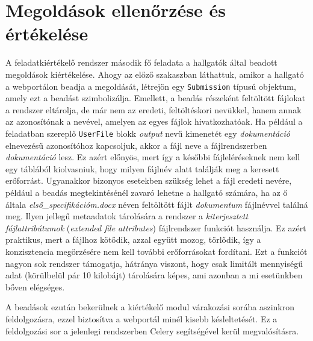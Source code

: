 \section{Megoldások ellenőrzése és értékelése}\label{section:submission-evaluation}
A feladatkiértékelő rendszer második fő feladata a hallgatók által beadott megoldások kiértékelése.
Ahogy az előző szakaszban láthattuk, amikor a hallgató a webportálon beadja a megoldását, létrejön egy \texttt{Submission} típusú objektum, amely ezt a beadást szimbolizálja.
Emellett, a beadás részeként feltöltött fájlokat a rendszer eltárolja, de már nem az eredeti, feltöltéskori nevükkel, hanem annak az azonosítónak a nevével, amelyen az egyes fájlok hivatkozhatóak.
Ha például a feladatban szereplő \texttt{UserFile} blokk \textit{output} nevű kimenetét egy \textit{dokumentáció} elnevezésű azonosítóhoz kapcsoljuk, akkor a fájl neve a fájlrendszerben \textit{dokumentáció} lesz.
Ez azért előnyös, mert így a későbbi fájleléréseknek nem kell egy táblából kiolvasniuk, hogy milyen fájlnév alatt találják meg a keresett erőforrást.
Ugyanakkor bizonyos esetekben szükség lehet a fájl eredeti nevére, például a beadás megtekintésénél zavaró lehetne a hallgató számára, ha az ő általa \textit{első\_specifikációm.docx} néven feltöltött fájlt \textit{dokumentum} fájlnévvel találná meg.
Ilyen jellegű metaadatok tárolására a rendszer a \textit{kiterjesztett fájlattribútumok} (\textit{extended file attributes}) fájlrendszer funkciót használja.
Ez azért praktikus, mert a fájlhoz kötődik, azzal együtt mozog, törlődik, így a konzisztencia megörzésére nem kell további erőforrásokat fordítani.
Ezt a funkciót nagyon sok rendszer támogatja, hátránya viszont, hogy csak limitált mennyiségű adat (körülbelül pár 10 kilobájt) tárolására képes, ami azonban a mi esetünkben bőven elégséges. \cite{wiki:ExtendedFileAttributes}

A beadások ezután bekerülnek a kiértékelő modul várakozási sorába aszinkron feldolgozásra, ezzel biztosítva a webportál minél kisebb késleltetését.
Ez a feldolgozási sor a jelenlegi rendszerben Celery segítségével kerül megvalósításra.


